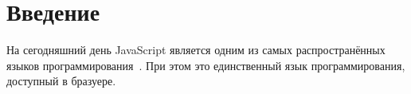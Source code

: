 \section*{Введение}

На сегодняшний день JavaScript является одним из самых
распространённых языков программирования~\cite{TIOBE,LANGPOP}.
При этом это единственный язык программирования,
доступный в бразуере.
